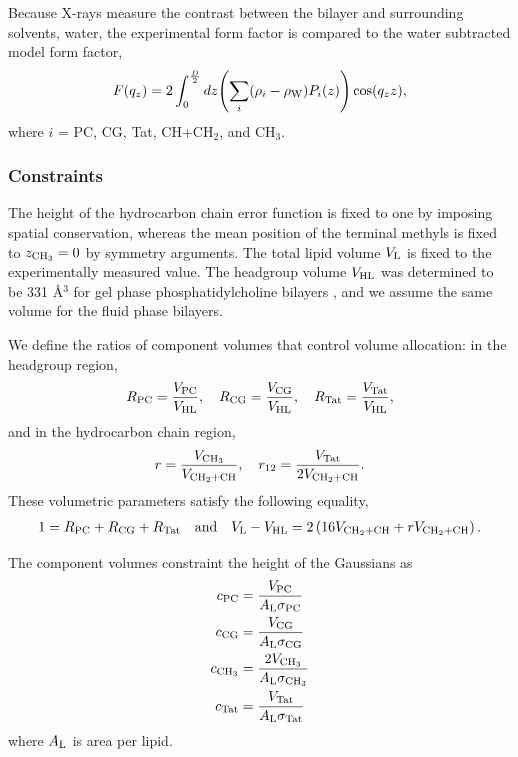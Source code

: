 Because X-rays measure the contrast between the bilayer and surrounding solvents, 
water, the experimental form factor is compared to the water subtracted model
form factor,
\begin{equation}
  F(q_z) = 2\int_0^{\frac{D}{2}} \mathop{dz} \mathopen{}\left( 
    \sum_i(\rho_i-\rho_\textrm{W})P_i(z)
   \right)\mathclose{} \cos(q_zz),
\end{equation}
where $i$ = PC, CG, Tat, CH+CH$_2$, and CH$_3$.

\subsubsection{Constraints}
The height of the hydrocarbon chain error function is fixed to one by imposing
spatial conservation, whereas the mean position of the terminal methyls is
fixed to $z_{\textrm{CH}_3}=0$ by symmetry arguments. The total lipid volume
$V_\textrm{L}$ is fixed to the experimentally measured value. 
The headgroup volume $V_\textrm{HL}$ was determined to be 331 \AA$^3$ for 
gel phase phosphatidylcholine bilayers \cite{ref:Tristram-Nagle02},
and we assume the same volume for the fluid phase bilayers.

We define the ratios of component volumes that control volume allocation:
in the headgroup region,
\begin{equation}
  R_\textrm{PC}=\frac{V_\textrm{PC}}{V_\textrm{HL}}, \quad R_\textrm{CG}=\frac{V_\textrm{CG}}{V_\textrm{HL}}, \quad R_\textrm{Tat}=\frac{V_\textrm{Tat}}{V_\textrm{HL}},
\end{equation}
and in the hydrocarbon chain region, 
\begin{equation}
  r=\frac{V_{\textrm{CH}_3}}{V_{\textrm{CH}_2+\textrm{CH}}}, \quad r_{12}=\frac{V_\textrm{Tat}}{2V_{\textrm{CH}_2+\textrm{CH}}}.
\end{equation}
These volumetric parameters satisfy the following equality,
\begin{align}
  1 = R_\textrm{PC} + R_\textrm{CG} + R_\textrm{Tat} \quad\text{and}\quad V_\textrm{L} - V_\textrm{HL} = 2\left(16V_{\textrm{CH}_2+\textrm{CH}} + rV_{\textrm{CH}_2+\textrm{CH}}\right).
\end{align}

The component volumes constraint the height of the Gaussians as
\begin{align}
  c_\textrm{PC} &= \frac{V_\textrm{PC}}{A_\textrm{L}\sigma_\textrm{PC}} \\
  c_\textrm{CG} &= \frac{V_\textrm{CG}}{A_\textrm{L}\sigma_\textrm{CG}} \\
  c_{\textrm{CH}_3} &= \frac{2V_{\textrm{CH}_3}}{A_\textrm{L}\sigma_{\textrm{CH}_3}} \\
  c_\textrm{Tat} &= \frac{V_\textrm{Tat}}{A_\textrm{L}\sigma_\textrm{Tat}}
\end{align}
where $A_\textrm{L}$ is area per lipid.

